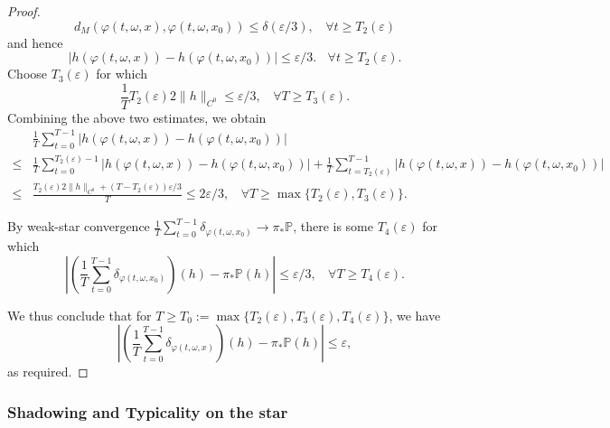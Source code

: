 \documentclass[a4paper]{article}
\theoremstyle{plain}
\theoremstyle{definition}
\newcommand{\PP}{\mathbb{P}}
\begin{document}
\begin{proof}
	$$d_M(\varphi(t,\omega,x) , \varphi(t,\omega,x_0) )\leq \delta(\varepsilon/3),~~~~\forall t\geq T_2(\varepsilon)$$
	and hence 
	$$|h(\varphi(t,\omega,x)) - h(\varphi(t,\omega,x_0)) |\leq \varepsilon/3.~~~~\forall t\geq T_2(\varepsilon).$$
	Choose $T_3(\varepsilon)$ for which
	$$\frac{1}{T}T_2(\varepsilon)2\|h\|_{C^0}\leq \varepsilon/3,~~~~\forall T\geq T_3(\varepsilon).$$
	Combining the above two estimates, we obtain
	\begin{align*}
		&\frac{1}{T} \sum_{t=0}^{T-1} |h(\varphi(t,\omega,x)) - h(\varphi(t,\omega,x_0))|\\ \leq& \frac{1}{T}\sum_{t=0}^{T_2(\varepsilon)-1}  |h(\varphi(t,\omega,x)) - h(\varphi(t,\omega,x_0))|  + \frac{1}{T}\sum_{t=T_2(\varepsilon)}^{T-1}  |h(\varphi(t,\omega,x)) - h(\varphi(t,\omega,x_0))| \\
		\leq &\frac{T_2(\varepsilon) 2 \|h\|_{C^0} + (T-T_2(\varepsilon))\varepsilon/3}{T} \leq 2\varepsilon/3,~~~~\forall T\geq \max\{T_2(\varepsilon),T_3(\varepsilon)\}.
	\end{align*}
	
	
	By weak-star convergence $\frac{1}{T} \sum_{t=0}^{T-1} \delta_{\varphi(t,\omega,x_0)}\to \pi_{*}\PP$, there is some $T_4(\varepsilon)$ for which
	$$\left|\left(\frac{1}{T} \sum_{t=0}^{T-1} \delta_{\varphi(t,\omega,x_0)}\right)(h) - \pi_{*}\PP(h)\right|\leq \varepsilon/3,~~~~\forall T\geq T_4(\varepsilon).$$
	
	We thus conclude that for $T\geq T_0:=\max\{T_2(\varepsilon),T_3(\varepsilon),T_4(\varepsilon)\}$, we have
	$$\left|\left(\frac{1}{T} \sum_{t=0}^{T-1} \delta_{\varphi(t,\omega,x)}\right)(h) - \pi_{*}\PP(h)\right|\leq \varepsilon,$$
	as required.
\end{proof}





\subsubsection{Shadowing and Typicality on the star}
\end{document}
